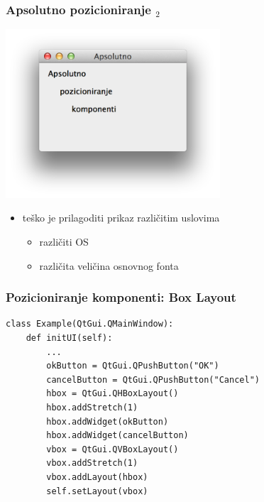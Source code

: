 \documentclass[utf8,compress]{beamer}
\begin{document}
\begin{frame}
  \frametitle{Apsolutno pozicioniranje $_2$}
\begin{center}
\includegraphics[width=8cm]{pyqt05.png}
\end{center}
  \begin{itemize}
    \item teško je prilagoditi prikaz različitim uslovima
    \begin{itemize}
      \item različiti OS
      \item različita veličina osnovnog fonta
    \end{itemize}
  \end{itemize}
\end{frame}

\begin{frame}[fragile]
  \frametitle{Pozicioniranje komponenti: Box Layout}
\begin{verbatim}
class Example(QtGui.QMainWindow):
    def initUI(self):
        ...
        okButton = QtGui.QPushButton("OK")
        cancelButton = QtGui.QPushButton("Cancel")
        hbox = QtGui.QHBoxLayout()
        hbox.addStretch(1)
        hbox.addWidget(okButton)
        hbox.addWidget(cancelButton)
        vbox = QtGui.QVBoxLayout()
        vbox.addStretch(1)
        vbox.addLayout(hbox)
        self.setLayout(vbox)    
\end{verbatim}
\end{frame}
\end{document}

